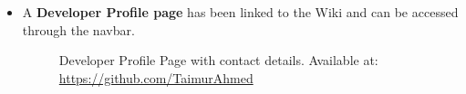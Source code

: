 \begin{enumerate}
\begin{itemize}
        \newpage
        
        \item A \textbf{Developer Profile page} has been linked to the Wiki and can be accessed through the navbar.
            \begin{figure}[H]
                \label{developer}
                \caption{Developer Profile Page with contact details. Available at: \url{https://github.com/TaimurAhmed}}
            \end{figure}
        

\end{itemize}
\end{enumerate}
